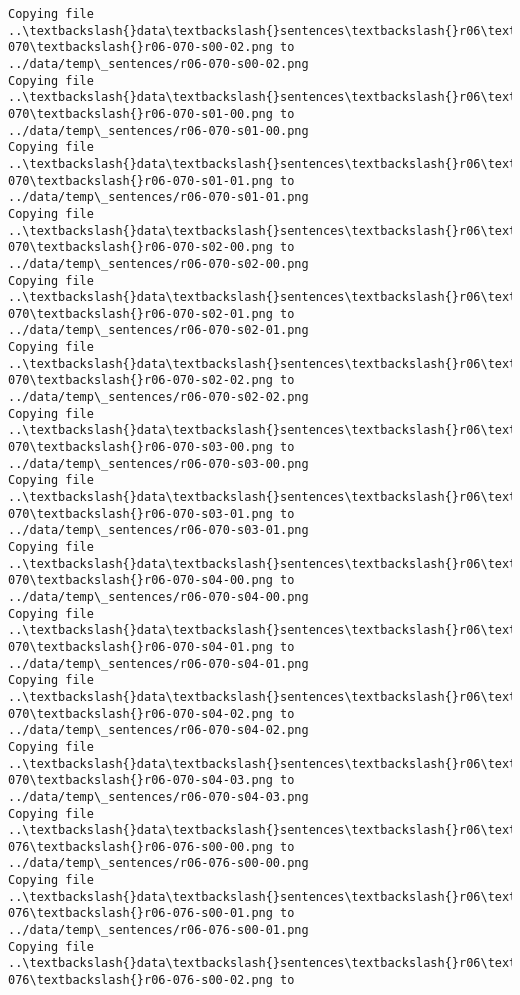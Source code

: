 \documentclass[11pt]{article}
\begin{document}
\begin{Verbatim}[commandchars=\\\{\}]
Copying file ..\textbackslash{}data\textbackslash{}sentences\textbackslash{}r06\textbackslash{}r06-070\textbackslash{}r06-070-s00-02.png to
../data/temp\_sentences/r06-070-s00-02.png
Copying file ..\textbackslash{}data\textbackslash{}sentences\textbackslash{}r06\textbackslash{}r06-070\textbackslash{}r06-070-s01-00.png to
../data/temp\_sentences/r06-070-s01-00.png
Copying file ..\textbackslash{}data\textbackslash{}sentences\textbackslash{}r06\textbackslash{}r06-070\textbackslash{}r06-070-s01-01.png to
../data/temp\_sentences/r06-070-s01-01.png
Copying file ..\textbackslash{}data\textbackslash{}sentences\textbackslash{}r06\textbackslash{}r06-070\textbackslash{}r06-070-s02-00.png to
../data/temp\_sentences/r06-070-s02-00.png
Copying file ..\textbackslash{}data\textbackslash{}sentences\textbackslash{}r06\textbackslash{}r06-070\textbackslash{}r06-070-s02-01.png to
../data/temp\_sentences/r06-070-s02-01.png
Copying file ..\textbackslash{}data\textbackslash{}sentences\textbackslash{}r06\textbackslash{}r06-070\textbackslash{}r06-070-s02-02.png to
../data/temp\_sentences/r06-070-s02-02.png
Copying file ..\textbackslash{}data\textbackslash{}sentences\textbackslash{}r06\textbackslash{}r06-070\textbackslash{}r06-070-s03-00.png to
../data/temp\_sentences/r06-070-s03-00.png
Copying file ..\textbackslash{}data\textbackslash{}sentences\textbackslash{}r06\textbackslash{}r06-070\textbackslash{}r06-070-s03-01.png to
../data/temp\_sentences/r06-070-s03-01.png
Copying file ..\textbackslash{}data\textbackslash{}sentences\textbackslash{}r06\textbackslash{}r06-070\textbackslash{}r06-070-s04-00.png to
../data/temp\_sentences/r06-070-s04-00.png
Copying file ..\textbackslash{}data\textbackslash{}sentences\textbackslash{}r06\textbackslash{}r06-070\textbackslash{}r06-070-s04-01.png to
../data/temp\_sentences/r06-070-s04-01.png
Copying file ..\textbackslash{}data\textbackslash{}sentences\textbackslash{}r06\textbackslash{}r06-070\textbackslash{}r06-070-s04-02.png to
../data/temp\_sentences/r06-070-s04-02.png
Copying file ..\textbackslash{}data\textbackslash{}sentences\textbackslash{}r06\textbackslash{}r06-070\textbackslash{}r06-070-s04-03.png to
../data/temp\_sentences/r06-070-s04-03.png
Copying file ..\textbackslash{}data\textbackslash{}sentences\textbackslash{}r06\textbackslash{}r06-076\textbackslash{}r06-076-s00-00.png to
../data/temp\_sentences/r06-076-s00-00.png
Copying file ..\textbackslash{}data\textbackslash{}sentences\textbackslash{}r06\textbackslash{}r06-076\textbackslash{}r06-076-s00-01.png to
../data/temp\_sentences/r06-076-s00-01.png
Copying file ..\textbackslash{}data\textbackslash{}sentences\textbackslash{}r06\textbackslash{}r06-076\textbackslash{}r06-076-s00-02.png to

\end{Verbatim}
\end{document}
